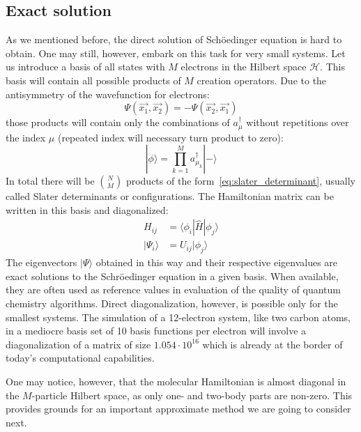 \subsection{Exact solution}
As we mentioned before, the direct solution of Sch{\"o}edinger equation is hard 
to obtain. One may still, however, embark on this task for very small systems. 
Let us introduce a basis of all states with $M$ electrons in the Hilbert 
space $\mathcal{H}$. This basis will contain all possible products of $M$ 
creation operators. Due to the antisymmetry of the 
wavefunction for electrons:
%
\begin{equation}
  \Psi(\vec{x_{1}}, \vec{x_{2}}) = - \Psi(\vec{x_{2}}, \vec{x_{1}}) 
\end{equation}
%
those products will contain only the combinations of $a^{\dagger}_{\mu}$ 
without repetitions over the index $\mu$ (repeated index will necessary turn 
product to zero):
%
\begin{equation}
 | \phi \rangle = \prod_{k=1}^{M} a^{\dagger}_{\mu_{k}} |- \rangle  
 \label{eq:slater_determinant}
\end{equation}
%
In total there will be $N \choose M$ products of the
form~\ref{eq:slater_determinant}, usually called Slater determinants or 
configurations. The Hamiltonian matrix can be written in this basis and 
diagonalized:
%
\begin{equation}
\begin{aligned}
 H_{ij} &= \langle \phi_{i} | \hat{H} | \phi_{j} \rangle \\
 | \Psi_{i} \rangle &= U_{ij} |\phi_{j} \rangle
\end{aligned}
\end{equation}
%
The eigenvectors $| \Psi \rangle$ obtained in this way and their respective 
eigenvalues are exact solutions to the Schr{\"o}edinger equation in a given 
basis. When available, they are often used as reference values in 
evaluation of the quality of quantum chemistry algorithms. Direct 
diagonalization, however, is possible only for the smallest systems. The 
simulation of a 12-electron system, like two carbon atoms, in a mediocre basis 
set of 10 basis functions per electron will involve a diagonalization of a 
matrix of size $1.054 \cdot 10^{16}$ which is already at the border of today's 
computational capabilities.

One may notice, however, that the molecular Hamiltonian is almost diagonal in 
the $M$-particle Hilbert space, as only one- and two-body parts are non-zero. 
This provides grounds for an important approximate method we are going to 
consider next. 


